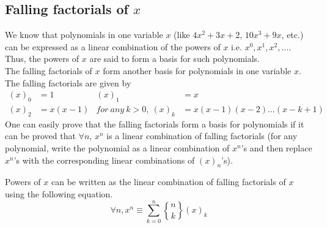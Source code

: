 \subsection{Falling factorials of $x$}
We know that polynomials in one variable $x$ (like $4x^2+3x+2$, $10x^3+9x$, etc.) can be expressed as a linear combination of the powers of $x$ i.e. $x^0,x^1,x^2,\ldots$. Thus, the powers of $x$ are said to form a basis for such polynomials. \\
    The falling factorials of $x$ form another basis for polynomials in one variable $x$. The falling factorials are given by
    \begin{align*}
        (x)_0 &= 1 &
        (x)_1 &= x\\
        (x)_2 &= x(x-1) &
        for~ any~k > 0,~ (x)_k &= x(x-1)(x-2)\ldots(x-k+1) 
    \end{align*}
    One can easily prove that the falling factorials form a basis for polynomials if it can be proved that $\forall n$, $x^n$ is a linear combination of falling factorials (for any polynomial, write the polynomial as a linear combination of $x^n$'s and then replace $x^n$'s with the corresponding linear combinations of $(x)_n$'s).
\begin{theorem}Powers of $x$ can be written as the linear combination of falling factorials of $x$ using the following equation.
    $$\forall n, x^n \equiv \sum_{k=0}^n {n \brace k} (x)_k$$
\end{theorem}    
